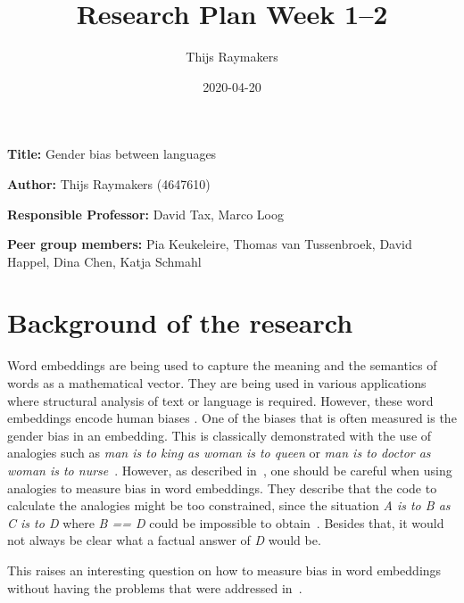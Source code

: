 \documentclass[english, a4paper, 11pt]{article}
\title{Research Plan Week 1--2}
\author{Thijs Raymakers}
\date{2020-04-20}
\newcommand{\namelistlabel}[1]{\mbox{#1}\hfil}
\newenvironment{namelist}[1]{%
\begin{list}{}
    {
        \let\makelabel\namelistlabel
        \settowidth{\labelwidth}{#1}
        \setlength{\leftmargin}{1.1\labelwidth}
    }
  }{%
\end{list}}
\begin{document}
\maketitle

\begin{namelist}{xxxxxxxxxxxxxxxxxxxxxxxxxxxxxxxxxxxxxxx}
\item[{\bf Title:}]
    Gender bias between languages
\item[{\bf Author:}]
    Thijs Raymakers (4647610)
\item[{\bf Responsible Professor:}]
    David Tax, Marco Loog
\item[{\bf Peer group members:}]
    Pia Keukeleire, 
    Thomas van Tussenbroek,
    David Happel,
    Dina Chen,
    Katja Schmahl
\end{namelist}


\section*{Background of the research}
Word embeddings are being used to capture the meaning and the semantics of words as a
mathematical vector. They are being used in various applications where structural
analysis of text or language is required. However, these word embeddings encode
human biases \cite{caliskan_2017_semantics_language_corpora, 2019arXiv190509866N, 2017arXiv171108412G, 2018arXiv180309288K, 2019arXiv190303862G}. One of the biases that is often
measured is the gender bias in an embedding. This is classically demonstrated with the
use of analogies such as \textit{man is to king as woman is to queen} or \textit{man is to doctor as woman is to nurse}~\cite{2019arXiv190509866N}.
However, as described in~\cite{2019arXiv190509866N}, one should be careful when using
analogies to measure bias in word embeddings. They describe that the code to calculate
the analogies might be too constrained, since the situation \textit{A is to B as C is to D}
where \textit{B == D} could be impossible to obtain~\cite{2019arXiv190509866N}. Besides
that, it would not always be clear what a factual answer of \textit{D} would be.

This raises an interesting question on how to measure bias in word embeddings without
having the problems that were addressed in~\cite{2019arXiv190509866N}.
\end{document}

